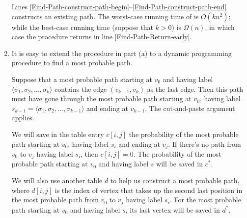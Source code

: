 \documentclass[a4paper, fleqn]{article}
\begin{document}
\begin{enumerate}
Lines
\ref{Find-Path-construct-path-begin}--\ref{Find-Path-construct-path-end}
constructs an existing path.  The worst-case running time of
 is $O(kn^2)$; while the best-case running time
(suppose that $k > 0$) is $\Omega(n)$, in which case the procedure
returns in line \ref{Find-Path-Return-early}.

\item  %

It is easy to extend the procedure  in part (a) to a
dynamic programming procedure to find a most probable path.

Suppose that a most probable path starting at $v_0$ and having label
\\ $\langle \sigma_1, \sigma_2, \ldots, \sigma_k \rangle$ contains the
edge $(v_{k-1}, v_k)$ as the last edge. Then this path must have gone
through the most probable path starting at $v_0$, having label
$s_{k-1} = \langle \sigma_1, \sigma_2, \ldots, \sigma_{k-1} \rangle$
and ending at $v_{k-1}$. The cut-and-paste argument applies.

We will save in the table entry $c[i,j]$ the probability of the most
probable path starting at $v_0$, having label $s_i$ and ending at
$v_j$. If there's no path from $v_0$ to $v_j$ having label $s_i$, then
$c[i,j] = 0$. The probability of the most probable path starting at
$v_0$ and having label $s$ will be saved in $c^*$.

We will also use another table $d$ to help us construct a most
probable path, where $d[i,j]$ is the index of vertex that takes up the
second last position in the most probable path from $v_0$ to $v_j$
having label $s_i$. For the most probable path starting at $v_0$ and
having label $s$, its last vertex will be saved in $d^*$.


\end{enumerate}
\end{document}
